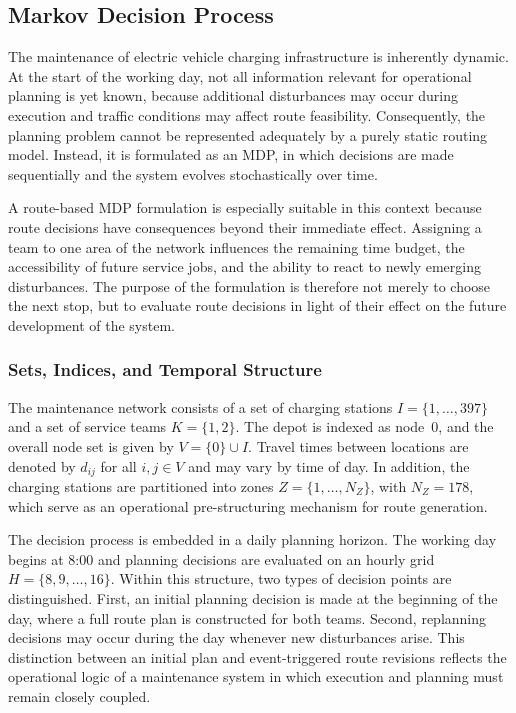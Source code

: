 \documentclass[12pt,oneside]{article}
\begin{document}
\subsection{Markov Decision Process}\label{subsec_markov_decision_process}
The maintenance of electric vehicle charging infrastructure is inherently dynamic. At the start of the working day, not all information relevant for operational planning is yet known, because additional disturbances may occur during execution and traffic conditions may affect route feasibility. Consequently, the planning problem cannot be represented adequately by a purely static routing model. Instead, it is formulated as an MDP, in which decisions are made sequentially and the system evolves stochastically over time.

A route-based MDP formulation is especially suitable in this context because route decisions have consequences beyond their immediate effect. Assigning a team to one area of the network influences the remaining time budget, the accessibility of future service jobs, and the ability to react to newly emerging disturbances. The purpose of the formulation is therefore not merely to choose the next stop, but to evaluate route decisions in light of their effect on the future development of the system.
\subsubsection{Sets, Indices, and Temporal Structure}
The maintenance network consists of a set of charging stations $I = \{1, \ldots, 397\}$ and a set of service teams $K = \{1, 2\}$. The depot is indexed as node~$0$, and the overall node set is given by $V = \{0\} \cup I$. Travel times between locations are denoted by $d_{ij}$ for all $i, j \in V$ and may vary by time of day. In addition, the charging stations are partitioned into zones $Z = \{1, \ldots, N_Z\}$, with $N_Z = 178$, which serve as an operational pre-structuring mechanism for route generation.

The decision process is embedded in a daily planning horizon. The working day begins at 8:00 and planning decisions are evaluated on an hourly grid $H = \{8, 9, \ldots, 16\}$. Within this structure, two types of decision points are distinguished. First, an initial planning decision is made at the beginning of the day, where a full route plan is constructed for both teams. Second, replanning decisions may occur during the day whenever new disturbances arise. This distinction between an initial plan and event-triggered route revisions reflects the operational logic of a maintenance system in which execution and planning must remain closely coupled.
\end{document}
